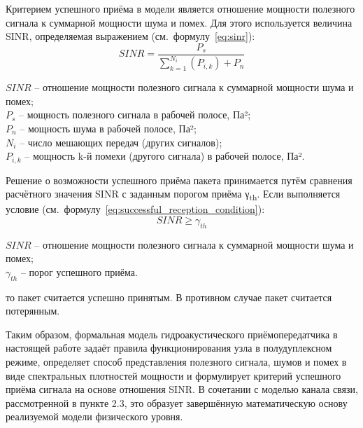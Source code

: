 \documentclass[
    numbers=section,
    document-code={ВКРБ--09.03.04--10.19--XX--26--81}
]{../latex/fqw}
\begin{document}
    Критерием успешного приёма в модели является отношение мощности полезного сигнала к суммарной мощности шума и помех.
    Для этого используется величина SINR, определяемая выражением
    (см.~формулу~\eqref{eq:sinr}):
    \begin{equation}
        SINR = \frac{P_{s}}{\sum_{k = 1}^{N_{i}}\left(P_{i,k}\right) + P_{n}}
        \label{eq:sinr}
    \end{equation}
    \begin{FqwWhere}
        \(SINR\) -- отношение мощности полезного сигнала к суммарной мощности шума и помех;\\
        \(P_{s}\) -- мощность полезного сигнала в рабочей полосе, Па²;\\
        \(P_{n}\) -- мощность шума в рабочей полосе, Па²;\\
        \(N_{i}\) -- число мешающих передач (других сигналов);\\
        \(P_{i,k}\) -- мощность k-й помехи (другого сигнала) в рабочей полосе, Па².
    \end{FqwWhere}

    Решение о возможности успешного приёма пакета принимается путём сравнения
    расчётного значения SINR
    с заданным порогом приёма γ\textsubscript{th}.
    Если выполняется условие (см.~формулу~\eqref{eq:successful_reception_condition}):
    \begin{equation}
        SINR \geq \gamma_{th}
        \label{eq:successful_reception_condition}
    \end{equation}
    \begin{FqwWhere}
        \(SINR\) -- отношение мощности полезного сигнала к суммарной мощности шума и помех;\\
        \(\gamma_{th}\) -- порог успешного приёма.
    \end{FqwWhere}

    то пакет считается успешно принятым.
    В противном случае пакет считается потерянным.

    Таким образом, формальная модель гидроакустического приёмопередатчика в
    настоящей работе задаёт правила функционирования узла в полудуплексном режиме,
    определяет способ представления полезного сигнала, шумов и помех в виде спектральных плотностей мощности и
    формулирует критерий успешного приёма сигнала на основе отношения SINR.
    В сочетании с моделью канала связи, рассмотренной в пункте 2.3,
    это образует завершённую математическую основу реализуемой модели физического уровня.
\end{document}

